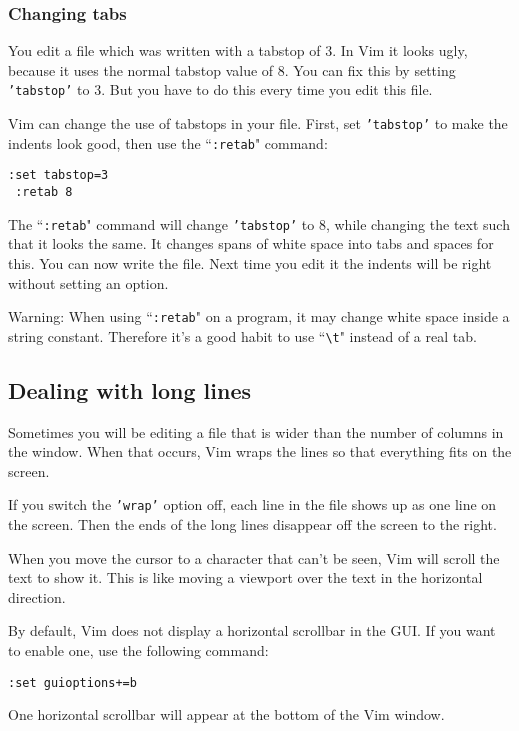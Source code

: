 \subsubsection{Changing tabs}
You edit a file which was written with a tabstop of 3.
In Vim it looks ugly, because it uses the normal tabstop value of 8.
You can fix this by setting \texttt{'tabstop'} to 3.
But you have to do this every time you edit this file.

Vim can change the use of tabstops in your file.
First, set \texttt{'tabstop'} to make the indents look good, then use the ``\texttt{:retab}" command:

\begin{Verbatim}[samepage=true]
 :set tabstop=3
 :retab 8
\end{Verbatim}

The ``\texttt{:retab}" command will change \texttt{'tabstop'} to 8, while changing the text such that it looks the same.
It changes spans of white space into tabs and spaces for this.
You can now write the file.
Next time you edit it the indents will be right without setting an option.

Warning: When using ``\texttt{:retab}" on a program, it may change white space inside a string constant.
Therefore it's a good habit to use ``\texttt{\textbackslash{}t}" instead of a real tab.
\subsection{Dealing with long lines}
Sometimes you will be editing a file that is wider than the number of columns in the window.
When that occurs, Vim wraps the lines so that everything fits on the screen.

If you switch the \texttt{'wrap'} option off, each line in the file shows up as one line on the screen.
Then the ends of the long lines disappear off the screen to the right.

When you move the cursor to a character that can't be seen, Vim will scroll the text to show it.
This is like moving a viewport over the text in the horizontal direction.

By default, Vim does not display a horizontal scrollbar in the GUI.
If you want to enable one, use the following command:

\begin{Verbatim}[samepage=true]
 :set guioptions+=b
\end{Verbatim}

One horizontal scrollbar will appear at the bottom of the Vim window.

